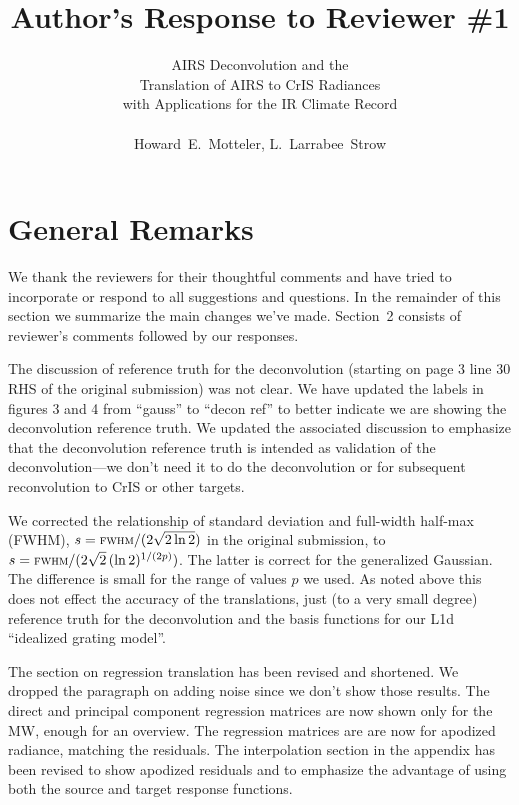 \documentclass[11pt]{article}
\begin{document}
\title{Author's Response to Reviewer \#1 }

\author{AIRS Deconvolution and the \\
       Translation of AIRS to CrIS Radiances \\ 
       with Applications for the IR Climate Record \\
       \\
       Howard~E.~Motteler, L.~Larrabee~Strow}

\maketitle

\section{General Remarks}

We thank the reviewers for their thoughtful comments and have tried
to incorporate or respond to all suggestions and questions.  In the
remainder of this section we summarize the main changes we've made.
Section~2 consists of reviewer's comments followed by our responses.

The discussion of reference truth for the deconvolution (starting on
page 3 line 30 RHS of the original submission) was not clear.  We
have updated the labels in figures 3 and 4 from ``gauss'' to ``decon
ref'' to better indicate we are showing the deconvolution reference
truth.  We updated the associated discussion to emphasize that the
deconvolution reference truth is intended as validation of the
deconvolution---we don't need it to do the deconvolution or for
subsequent reconvolution to CrIS or other targets.

We corrected the relationship of standard deviation and full-width
half-max (FWHM), $s=\mbox{\small\textsc{fwhm}} / (2\sqrt{2\ln 2})$ in the original
submission, to $s=\mbox{\small\textsc{fwhm}} / (2\sqrt{2}\,(\ln 2)^{1/(2p)})$.  The
latter is correct for the generalized Gaussian.  The difference is
small for the range of values $p$ we used.  As noted above this does
not effect the accuracy of the translations, just (to a very small
degree) reference truth for the deconvolution and the basis
functions for our L1d ``idealized grating model''.

The section on regression translation has been revised and
shortened.  We dropped the paragraph on adding noise since we don't
show those results.  The direct and principal component regression
matrices are now shown only for the MW, enough for an overview.  
The regression matrices are are now for apodized radiance, matching
the residuals.  The interpolation section in the appendix has been
revised to show apodized residuals and to emphasize the advantage of
using both the source and target response functions.
\end{document}
